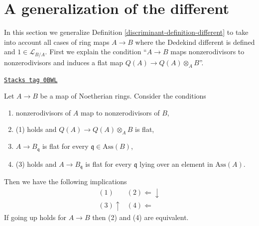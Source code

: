 \section{A generalization of the different}
\label{discriminant-section-different-generalization}
In this section we generalize Definition \ref{discriminant-definition-different}
to take into account all cases of ring maps $A \to B$
where the Dedekind different is defined and $1 \in \mathcal{L}_{B/A}$.
First we explain the condition ``$A \to B$ maps nonzerodivisors to
nonzerodivisors and induces a flat map $Q(A) \to Q(A) \otimes_A B$''.

\begin{lemma}
\label{discriminant-lemma-explain-condition}
\href{https://stacks.math.columbia.edu/tag/0BWL}{\texttt{Stacks tag 0BWL}}

Let $A \to B$ be a map of Noetherian rings. Consider the conditions
\begin{enumerate}
\item nonzerodivisors of $A$ map to nonzerodivisors of $B$,
\item (1) holds and $Q(A) \to Q(A) \otimes_A B$ is flat,
\item $A \to B_\mathfrak q$ is flat for every
$\mathfrak q \in \text{Ass}(B)$,
\item (3) holds and $A \to B_\mathfrak q$ is flat for every $\mathfrak q$
lying over an element in $\text{Ass}(A)$.
\end{enumerate}
Then we have the following implications
$$
\begin{array}{cc}(1) & (2) \Longleftarrow\downarrow \\ (3) \uparrow & (4) \Longleftarrow\end{array}
$$
If going up holds for $A \to B$ then (2) and (4) are equivalent.
\end{lemma}

